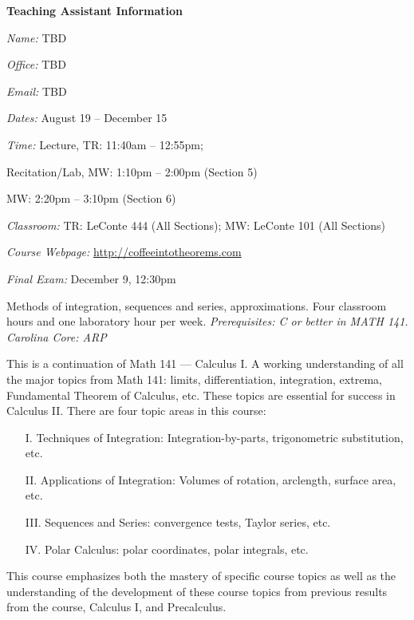 \documentclass[11pt,letterpaper]{article}
\newcommand{\classdates}{August 19 -- December 15}
\newcommand{\classtimes}{Lecture, TR: 11:40am -- 12:55pm; \par \hspace{0.95cm} Recitation/Lab, MW: 1:10pm -- 2:00pm (Section 5) \par \hspace{3.65cm} MW: 2:20pm -- 3:10pm (Section 6)}
\newcommand{\classroom}{TR: LeConte 444 (All Sections); MW: LeConte 101 (All Sections)}
\newcommand{\website}{http://coffeeintotheorems.com}
\begin{document}
{\bfseries\color{scred} Teaching Assistant Information} \par \vspace{0.1cm}
\hspace{0.25cm} \begin{minipage}[b]{0.4\textwidth}
        \textit{Name:} TBD \par
        \textit{Office:} TBD \par
        \textit{Email:} TBD%
\end{minipage}
\pspace



\textit{Dates:} \classdates \par
\textit{Time:} \classtimes \par
\textit{Classroom:} \classroom \par
\textit{Course Webpage:} \href{\website}{\website} \par
\textit{Final Exam:} December 9, 12:30pm
\sectionbreak




Methods of integration, sequences and series, approximations. Four classroom hours and one laboratory hour per week. {\itshape Prerequisites: C or better in MATH 141. Carolina Core: ARP}
\sectionbreak




This is a continuation of Math 141 --- Calculus I. A working understanding of all the major topics from Math 141: limits, differentiation, integration, extrema, Fundamental Theorem of Calculus, etc. These topics are essential for success in Calculus II. There are four topic areas in this course: \par
	\begin{enumerate}
	\item[I.] Techniques of Integration: Integration-by-parts, trigonometric substitution, etc.
	\item[II.] Applications of Integration: Volumes of rotation, arclength, surface area, etc.
	\item[III.] Sequences and Series: convergence tests, Taylor series, etc.
	\item[IV.] Polar Calculus: polar coordinates, polar integrals, etc.
	\end{enumerate} \par
This course emphasizes both the mastery of specific course topics as well as the understanding of the development of these course topics from previous results from the course, Calculus I, and Precalculus.
\sectionbreak
\end{document}
